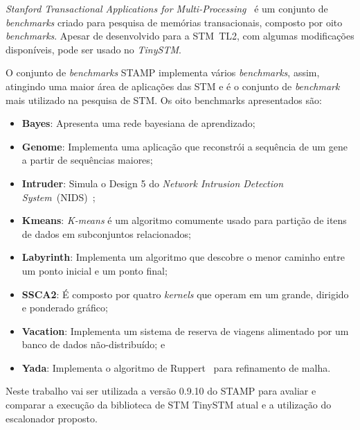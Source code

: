 \documentclass[diss,capa]{texufpel}
\begin{document}
\emph{Stanford Transactional Applications for Multi-Processing}~\cite{STAMP} é um conjunto de \emph{benchmarks} criado para pesquisa de memórias transacionais, composto por oito \emph{benchmarks}. Apesar de desenvolvido para a STM~TL2, com algumas modificações disponíveis, pode ser usado no \emph{TinySTM}.


O conjunto de \emph{benchmarks} STAMP implementa vários \emph{benchmarks}, assim, atingindo uma maior área de aplicações das STM e é o conjunto de \emph{benchmark} mais utilizado na pesquisa de STM. Os oito benchmarks apresentados são:

\begin{itemize}
  \item \textbf{Bayes}: Apresenta uma rede bayesiana de aprendizado;
  \item \textbf{Genome}: Implementa uma aplicação que reconstrói a sequência de um gene a partir de sequências maiores;
  \item \textbf{Intruder}: Simula o Design 5 do \emph{Network Intrusion Detection System}~(NIDS)~\cite{Haagdorens05};
  \item \textbf{Kmeans}:  \emph{K-means} é um algoritmo comumente usado para partição de itens de dados em subconjuntos relacionados;
  \item \textbf{Labyrinth}: Implementa um algoritmo que descobre o menor caminho entre um ponto inicial e um ponto final;
  \item \textbf{SSCA2}: É composto por quatro \emph{kernels} que operam em um grande, dirigido e ponderado gráfico;
  \item \textbf{Vacation}: Implementa um sistema de reserva de viagens alimentado por um banco de dados não-distribuído; e
  \item \textbf{Yada}: Implementa o algoritmo de Ruppert~\cite{Ruppert95} para refinamento de malha.
\end{itemize}

Neste trabalho vai ser utilizada a versão 0.9.10 do STAMP para avaliar e comparar a execução da biblioteca de STM TinySTM atual e a utilização do escalonador proposto.

\end{document}
